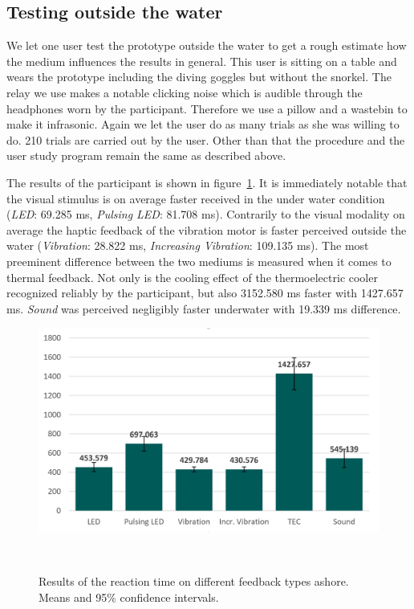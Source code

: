 \subsection{Testing outside the water}

We let one user test the prototype outside the water to get a rough estimate how the medium influences the results in general.
This user is sitting on a table and wears the prototype including the diving goggles but without the snorkel.
The relay we use makes a notable clicking noise which is audible through the headphones worn by the participant.
Therefore we use a pillow and a wastebin to make it infrasonic.
Again we let the user do as many trials as she was willing to do.
210 trials are carried out by the user.
Other than that the procedure and the user study program remain the same as described above.

The results of the participant is shown in figure~\ref{fig:user12}.
It is immediately notable that the visual stimulus is on average faster received in the under water condition (\emph{LED}: 69.285 ms, \emph{Pulsing LED}: 81.708 ms).
Contrarily to the visual modality on average the haptic feedback of the vibration motor is faster perceived outside the water (\emph{Vibration}: 28.822 ms, \emph{Increasing Vibration}: 109.135 ms).
The most preeminent difference between the two mediums is measured when it comes to thermal feedback.
Not only is the cooling effect of the thermoelectric cooler recognized reliably by the participant, but also 3152.580 ms faster with 1427.657 ms.
\emph{Sound} was perceived negligibly faster underwater with 19.339 ms difference.

\begin{figure}
	\includegraphics[width=\columnwidth]{images/ResultsOfReactionTimesUser12.png}
	\caption{Results of the reaction time on different feedback types ashore. Means and 95\% confidence intervals. }~\label{fig:user12}
\end{figure}

